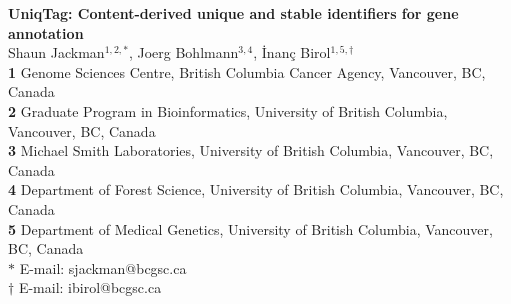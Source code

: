 \documentclass[10pt]{article}
\date{}
\begin{document}
\begin{flushleft}
{\large
\textbf{UniqTag: Content-derived unique and stable identifiers for gene annotation}
}
\\
Shaun Jackman$^{1,2,\ast}$,
Joerg Bohlmann$^{3,4}$,
\.{I}nan\c{c} Birol$^{1,5,\dagger}$
\\ \textbf{1} Genome Sciences Centre, British Columbia Cancer Agency, Vancouver, BC, Canada
\\ \textbf{2} Graduate Program in Bioinformatics, University of British Columbia, Vancouver, BC, Canada
\\ \textbf{3} Michael Smith Laboratories, University of British Columbia, Vancouver, BC, Canada
\\ \textbf{4} Department of Forest Science, University of British Columbia, Vancouver, BC, Canada
\\ \textbf{5} Department of Medical Genetics, University of British Columbia, Vancouver, BC, Canada
\\ $\ast$ E-mail: sjackman@bcgsc.ca
\\ $\dagger$ E-mail: ibirol@bcgsc.ca
\end{flushleft}
\end{document}
